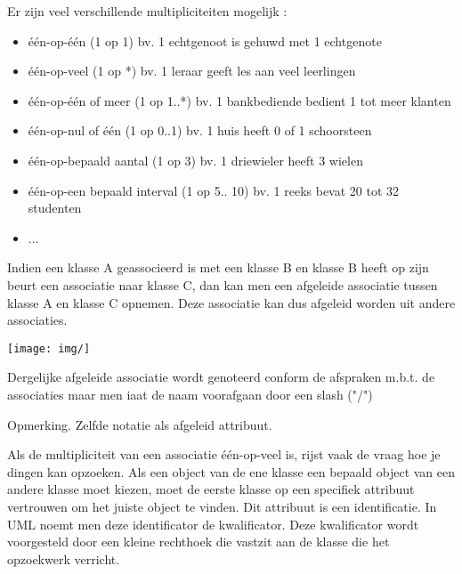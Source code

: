 Er zijn veel verschillende multipliciteiten mogelijk :

\begin{itemize}
    \item één-op-één (1 op 1)
bv. 1 echtgenoot is gehuwd met 1 echtgenote
    \item één-op-veel (1 op *)
bv. 1 leraar geeft les aan veel leerlingen
    \item één-op-één of meer (1 op 1..*)
bv. 1 bankbediende bedient 1 tot meer klanten
    \item één-op-nul of één (1 op 0..1)
bv. 1 huis heeft 0 of 1 schoorsteen
\item één-op-bepaald aantal (1 op 3) bv. 1 driewieler heeft 3 wielen
    \item één-op-een bepaald interval (1 op 5.. 10) bv. 1 reeks bevat 20 tot 32 studenten
    \item ...
\end{itemize}


Indien een klasse A geassocieerd is met een klasse B en klasse B heeft op zijn beurt een associatie naar klasse C, dan kan men een afgeleide associatie tussen klasse A en klasse C opnemen. Deze associatie kan dus afgeleid worden uit andere associaties.


\begin{center}
\texttt{[image: img/]}%
\label{labelname}%
\end{center}

Dergelijke afgeleide associatie wordt genoteerd conform de afspraken m.b.t. de associaties maar men iaat de naam voorafgaan door een slash ("/")

Opmerking. Zelfde notatie als afgeleid attribuut.


Als de multipliciteit van een associatie één-op-veel is, rijst vaak de vraag hoe je dingen kan opzoeken. Als een object van de ene klasse een bepaald object van een andere klasse moet kiezen, moet de eerste klasse op een specifiek attribuut vertrouwen om het juiste object te vinden. Dit attribuut is een identificatie.
In UML noemt men deze identificator de kwalificator. Deze kwalificator wordt voorgesteld door een kleine rechthoek die vastzit aan de klasse die het opzoekwerk verricht.


